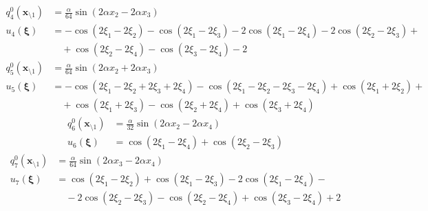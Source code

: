 \documentclass[11pt]{jfm}
\numberwithin{equation}{section}
\begin{document}
\vspace{-0.4cm}
\begin{subequations}
\label{A7}
\begin{align}
q_4^0(\boldsymbol{x}_{\setminus 1})&=\frac{\alpha}{64}   \sin (2 \alpha  x_2-2 \alpha  x_3)\label{A7a} \\
u_4(\boldsymbol{\xi})&=-\cos (2 \xi_1-2 \xi_2)-\cos (2 \xi_1-2 \xi_3)-2 \cos (2 \xi_1-2 \xi_4)-2 \cos (2 \xi_2-2 \xi_3)+ \nonumber\\
&\quad+\cos (2 \xi_2-2 \xi_4)-\cos (2 \xi_3-2 \xi_4)-2\label{A7b}
\end{align}\end{subequations}
\vspace{-0.4cm}
\begin{subequations}
\label{A8}
\begin{align}
q_5^0(\boldsymbol{x}_{\setminus 1})&=\frac{\alpha}{64}   \sin (2 \alpha  x_2+2 \alpha  x_3) \label{A8a} \\
u_5(\boldsymbol{\xi})&=-\cos (2 \xi_1-2 \xi_2+2 \xi_3+2 \xi_4)-\cos (2 \xi_1-2 \xi_2-2 \xi_3-2 \xi_4)+\cos (2 \xi_1+2 \xi_2)+ \nonumber\\
&\quad+\cos (2 \xi_1+2 \xi_3)-\cos (2 \xi_2+2 \xi_4)+\cos (2 \xi_3+2 \xi_4)
\label{A8b}
\end{align}\end{subequations}
\vspace{-0.4cm}
\begin{subequations}
\label{A9}
\begin{align}
q_6^0(\boldsymbol{x}_{\setminus 1})&=\frac{\alpha}{32}   \sin (2 \alpha  x_2-2 \alpha  x_4)\label{A9a} \\
u_6(\boldsymbol{\xi})&=\cos (2 \xi_1-2 \xi_4)+\cos (2 \xi_2-2 \xi_3)
\label{A9b}
\end{align}\end{subequations}
\vspace{-0.4cm}
\begin{subequations}
\label{A10}
\begin{align}
q_7^0(\boldsymbol{x}_{\setminus 1})&=\frac{\alpha}{64}   \sin (2 \alpha  x_3-2 \alpha  x_4) \label{A10a} \\
u_7(\boldsymbol{\xi})&=\cos (2 \xi_1-2 \xi_2)+\cos (2 \xi_1-2 \xi_3)-2 \cos (2 \xi_1-2 \xi_4)- \nonumber\\
&\quad-2 \cos (2 \xi_2-2 \xi_3)-\cos (2 \xi_2-2 \xi_4)+\cos (2 \xi_3-2 \xi_4)+2
\label{A10b}
\end{align}\end{subequations}
\vspace{-0.4cm}
\end{document}
